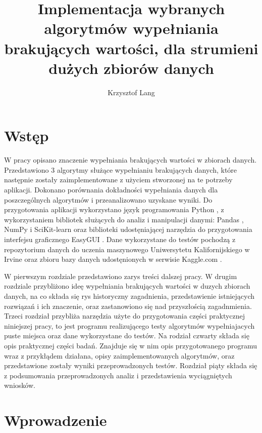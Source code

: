 \documentclass[12pt,twoside]{article}
\author{Krzysztof Lang}
\title{Implementacja wybranych algorytmów wypełniania brakujących wartości, dla strumieni dużych zbiorów danych}
\begin{document}
\maketitle

\blankpage

\tableofcontents
\clearpage
\blankpage


\section{Wstęp}

W pracy opisano znaczenie wypełniania brakujących wartości w zbiorach danych.
Przedstawiono 3 algorytmy służące wypełnianiu brakujących danych, które następnie zostały zaimplementowane z użyciem
stworzonej na te potrzeby aplikacji. Dokonano porównania dokładności wypełniania danych dla poszczególnych algorytmów
i przeanalizowano uzyskane wyniki. Do przygotowania aplikacji wykorzystano język programowania Python \cite{python},
z wykorzystaniem bibliotek służących do analiz i manipulacji danymi: Pandas \cite{pandas},
NumPy \cite{numpy} i SciKit-learn oraz biblioteki
udostęniającej narzędzia do przygotowania interfejsu graficznego EasyGUI \cite{easygui}.
Dane wykorzystane do testów pochodzą z repozytorium danych do uczenia maszynowego
Uniwersytetu Kalifornijskiego w Irvine \cite{uci} oraz zbioru bazy danych
udostęnionych w serwisie Kaggle.com  \cite{kaggle}.

W pierwszym rozdziale przedstawiono zarys treści dalszej pracy.
W drugim rozdziale przybliżono ideę wypełniania brakujących wartości w duzych zbiorach danych,
na co składa się rys historyczny zagadnienia, przedstawienie istniejących rozwiązań i ich znaczenie,
oraz zastanowiono się nad przyszłością zagadnmienia.
Trzeci rozdział przybliża narzędzia użyte do przygotowania części praktycznej niniejszej pracy,
to jest programu realizującego testy algorytmów wypełniajacych puste miejsca oraz
dane wykorzystane do testów.
Na rodział czwarty składa się opis praktycznej części badań.
Znajduje się w nim opis przygotowanego programu wraz z przykłądem działana, opisy zaimplementowanych algorytmów,
oraz przedstawione zostały wyniki przeprowadzonych testów.
Rozdział piąty składa się z podsumowania przeprowadzonych analiz i przedstawienia wyciągniętych wniosków.

\clearpage


\section{Wprowadzenie}
\end{document}
